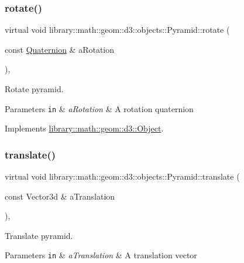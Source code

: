 \subsubsection{\texorpdfstring{rotate()}{rotate()}}
{\footnotesize\ttfamily virtual void library\+::math\+::geom\+::d3\+::objects\+::\+Pyramid\+::rotate (\begin{DoxyParamCaption}\item[{const \hyperlink{classlibrary_1_1math_1_1geom_1_1trf_1_1rot_1_1_quaternion}{Quaternion} \&}]{a\+Rotation }\end{DoxyParamCaption})\hspace{0.3cm}{\ttfamily [override]}, {\ttfamily [virtual]}}



Rotate pyramid. 


\begin{DoxyParams}[1]{Parameters}
\mbox{\tt in}  & {\em a\+Rotation} & A rotation quaternion \\
\hline
\end{DoxyParams}


Implements \hyperlink{classlibrary_1_1math_1_1geom_1_1d3_1_1_object_aabefebc4960530ce6356c4445c5d490e}{library\+::math\+::geom\+::d3\+::\+Object}.

\mbox{\label{classlibrary_1_1math_1_1geom_1_1d3_1_1objects_1_1_pyramid_a8a8514a9db12bea021014ce38a6db3b5}} 
\subsubsection{\texorpdfstring{translate()}{translate()}}
{\footnotesize\ttfamily virtual void library\+::math\+::geom\+::d3\+::objects\+::\+Pyramid\+::translate (\begin{DoxyParamCaption}\item[{const Vector3d \&}]{a\+Translation }\end{DoxyParamCaption})\hspace{0.3cm}{\ttfamily [override]}, {\ttfamily [virtual]}}



Translate pyramid. 


\begin{DoxyParams}[1]{Parameters}
\mbox{\tt in}  & {\em a\+Translation} & A translation vector \\
\hline
\end{DoxyParams}


